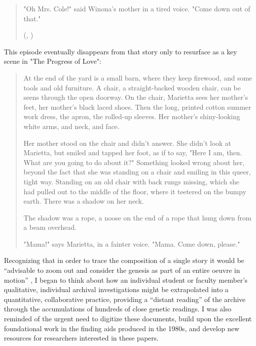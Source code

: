 \begin{paper}
\begin{quote}
"Oh Mrs. Cole!" said Winona's mother in a tired voice. "Come down out of that."
\begin{flushright}
    (\cite[197]{munro_alice_nodate}, )    
\end{flushright}    
\end{quote}

\noindent This episode eventually disappears from that story only to resurface as a key scene in "The Progress of Love":

\begin{quote}
At the end of the yard is a small barn, where they keep firewood, and some tools and old furniture. A chair, a straight-backed wooden chair, can be seens through the open doorway. On the chair, Marietta sees her mother's feet, her mother's black laced shoes. Then the long, printed cotton summer work dress, the apron, the rolled-up sleeves. Her mother's shiny-looking white arms, and neck, and face.

Her mother stood on the chair and didn't answer. She didn't look at Marietta, but smiled and tapped her foot, as if to say, "Here I am, then. What are you going to do about it?" Something looked wrong about her, beyond the fact that she was standing on a chair and smiling in this queer, tight way. Standing on an old chair with back rungs missing, which she had pulled out to the middle of the floor, where it teetered on the bumpy earth. There was a shadow on her neck.

The shadow was a rope, a noose on the end of a rope that hung down from a beam overhead.

"Mama!" says Marietta, in a fainter voice. "Mama. Come down, please."
\begin{flushright}
    \parencite[10]{munro_progress_1986}
\end{flushright}
\end{quote}

Recognizing that in order to trace
the composition of a single story it would be ``advisable to zoom out
and consider the genesis as part of an entire oeuvre in motion'' \citep[60]{van_hulle_genetic_2022}, I began to think about how an individual student or faculty
member's qualitative, individual archival investigations might be
extrapolated into a quantitative, collaborative practice, providing a
``distant reading'' of the archive through the accumulations of hundreds
of close genetic readings. I was also reminded of the urgent need to
digitize these documents, build upon the excellent foundational work in
the finding aids produced in the 1980s, and develop new resources for
researchers interested in these papers.



\end{paper}
